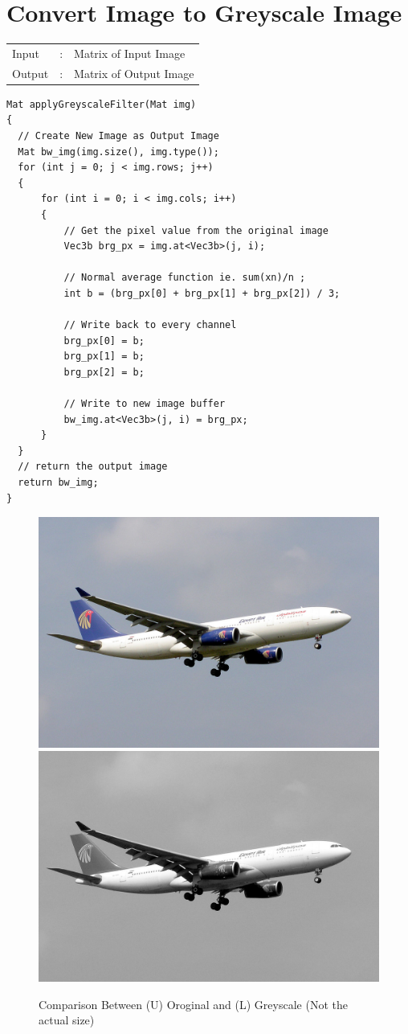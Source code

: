 \documentclass[12pt,a4paper]{report}
\begin{document}
\section{Convert Image to Greyscale Image}
\begin{tabular}{lll}
  Input  & : & Matrix of Input Image  \\
  Output & : & Matrix of Output Image \\
\end{tabular}
\begin{lstlisting}
Mat applyGreyscaleFilter(Mat img)
{
  // Create New Image as Output Image
  Mat bw_img(img.size(), img.type());
  for (int j = 0; j < img.rows; j++)
  {
      for (int i = 0; i < img.cols; i++)
      {
          // Get the pixel value from the original image
          Vec3b brg_px = img.at<Vec3b>(j, i);

          // Normal average function ie. sum(xn)/n ;
          int b = (brg_px[0] + brg_px[1] + brg_px[2]) / 3;

          // Write back to every channel
          brg_px[0] = b;
          brg_px[1] = b;
          brg_px[2] = b;

          // Write to new image buffer
          bw_img.at<Vec3b>(j, i) = brg_px;
      }
  }
  // return the output image
  return bw_img;
}
\end{lstlisting}
\begin{figure}[!htb]
  \centering
  \includegraphics[width=0.9\linewidth]{test_img/aeroplane.png}
  \includegraphics[width=0.9\linewidth]{result_img/aeroplane_Q1.png}
  \caption{Comparison Between (U) Oroginal and (L) Greyscale (Not the actual size)}
\end{figure}
\clearpage
\end{document}
